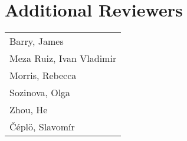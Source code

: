 \documentclass{easychair}
\begin{document}
\section*{Additional Reviewers}
\begin{longtable}{l}
\\
Barry, James
\\
Meza Ruiz, Ivan Vladimir
\\
Morris, Rebecca
\\
Sozinova, Olga
\\
Zhou, He
\\
\v{C}\'epl\"o, Slavom\'ir
\end{longtable}
\end{document}
